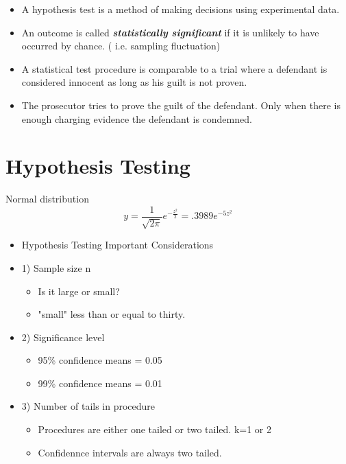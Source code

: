 \documentclass[]{report}
\begin{document}
{\begin{itemize} \item
A hypothesis test is a method of making decisions using experimental data. \item An outcome is called \textbf{\emph{statistically significant}} if it is unlikely to have occurred by chance. ( i.e. sampling fluctuation)


\bigskip
\item A statistical test procedure is comparable to a trial where a defendant is considered innocent as long as his guilt is not proven.\item  The prosecutor tries to prove the guilt of the defendant. Only when there is enough charging evidence the defendant is condemned.
\end{itemize}






\section*{Hypothesis Testing}




Normal distribution
\[ y = \frac{1}{{\sqrt {2\pi } }}e^{ - \frac{{z^2 }}{2}} = .3989e^{ - 5z^2 } \]




\begin{itemize}
\item Hypothesis Testing 
Important Considerations

\item1) Sample size n

\begin{itemize}
\item Is it large or small?       
\item "small" less than or equal to thirty.
\end{itemize}


\item2) Significance level 
\begin{itemize}
\item 95\% confidence means = 0.05
\item 99\% confidence means = 0.01
\end{itemize}


\item3) Number of tails in procedure
\begin{itemize}
\item Procedures are either one tailed or two tailed.  k=1 or 2
\item Confidennce intervals are always two tailed.
\end{itemize}



\end{itemize}}
\end{document}
